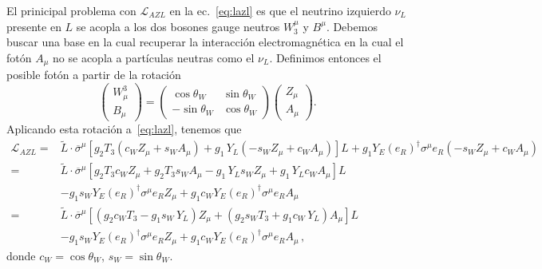 \begin{frame}
El prinicipal problema con $\mathcal{L}_{AZL}$ en la ec.~\eqref{eq:lazl} es que el neutrino izquierdo $\nu_L$ presente en $L$ se acopla a los dos bosones gauge neutros $W_3^{\mu}$ y $B^{\mu}$. Debemos buscar una base en la cual recuperar la interacción electromagnética en la cual el fotón $A_{\mu}$ no se acopla a partículas neutras como el $\nu_L$. Definimos entonces el posible fotón a partir de la rotación
\begin{equation}
\label{eq:rottw}
  \begin{pmatrix}
    W^3_\mu\\
    B_\mu
  \end{pmatrix}=\begin{pmatrix}
    \cos\theta_W & \sin\theta_W\\
    -\sin\theta_W& \cos\theta_W
  \end{pmatrix}
  \begin{pmatrix}
    Z_\mu\\
    A_\mu
  \end{pmatrix}.
\end{equation}
Aplicando esta rotación a~\eqref{eq:lazl}, tenemos que
\begin{align}
\label{eq:brot}
   \mathcal{L}_{A Z L}=& \widetilde{L}\cdot\overline{\sigma}^\mu\left[g_2 T_3(c_W Z_\mu+s_W A_\mu)+{g_1}\,Y_L(-s_W Z_\mu+c_W A_\mu)\right]L
    +g_1 Y_E\left(e_R \right)^{\dagger}\sigma^\mu  {e_R} (-s_W Z_\mu+c_W A_\mu)\nonumber\\
     =& \widetilde{L}\cdot\overline{\sigma}^\mu\left[g_2 T_3c_W Z_\mu+g_2 T_3s_W A_\mu-{g_1}\,Y_Ls_W Z_\mu+{g_1}\,Y_Lc_W A_\mu\right]L\nonumber\\
&-g_1 s_W Y_E\left(e_R \right)^{\dagger}\sigma^\mu  {e_R}Z_{\mu}  +g_1 c_W Y_E\left(e_R \right)^{\dagger}\sigma^\mu  {e_R}A_{\mu}  \nonumber\\
    =& \widetilde{L}\cdot\overline{\sigma}^\mu\left[\left(g_2 c_WT_3-{g_1}s_W\,Y_L\right)Z_\mu
       +\left(g_2 s_W T_3+{g_1}c_W\,Y_L\right) A_\mu\right]L \nonumber\\
&-g_1 s_W Y_E\left(e_R \right)^{\dagger}\sigma^\mu  {e_R}Z_{\mu}  +g_1 c_W Y_E\left(e_R \right)^{\dagger}\sigma^\mu  {e_R}A_{\mu}  \,,
\end{align}
donde $c_W=\cos\theta_W$, $s_W=\sin\theta_W$. 


\end{frame}

